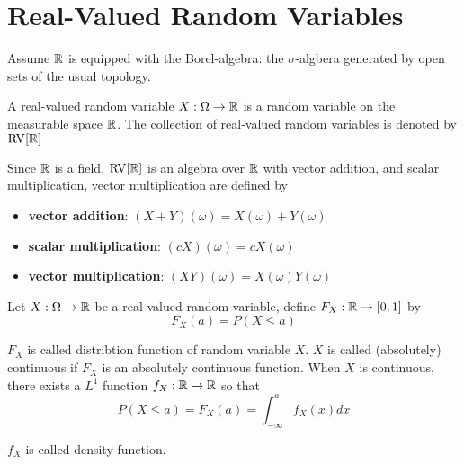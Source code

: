 \documentclass{report}
\begin{document}

\section{Real-Valued Random Variables}

Assume $\mathbb{R}$ is equipped with the Borel-algebra: the $\sigma$-algbera generated by open sets of the usual topology.

\begin{definition}
    A real-valued random variable $X: \Omega \to \mathbb{R}$ is a random variable on the measurable space $\mathbb{R}$. The collection of real-valued random variables is denoted by $\operatorname{RV}[\mathbb{R}]$
\end{definition}

\begin{proposition}
    Since $\mathbb{R}$ is a field, $\operatorname{RV}[\mathbb{R}]$ is an algebra over $\mathbb{R}$ with vector addition, and scalar multiplication, vector multiplication are defined by
    \begin{itemize}
        \item \textbf{vector addition}: $(X + Y)(\omega) = X(\omega) + Y(\omega)$
        \item \textbf{scalar multiplication}: $(cX)(\omega) = c X(\omega)$
        \item \textbf{vector multiplication}: $(XY)(\omega) = X(\omega) Y(\omega)$
    \end{itemize}
\end{proposition}

\begin{definition}
	Let $X: \Omega \to \mathbb{R}$ be a real-valued random variable, define $F_X: \mathbb{R} \to [0, 1]$ by
	$$
		F_X(a) = P(X \leq a)
	$$
	
	$F_X$ is called distribtion function of random variable $X$. $X$ is called (absolutely) continuous if $F_X$ is an absolutely continuous function. When $X$ is continuous, there exists a $L^1$ function $f_X: \mathbb{R} \to \mathbb{R}$ so that
	$$
		P(X \leq a) = F_X(a) = \int_{-\infty}^a f_X(x) dx
	$$
	
	$f_X$ is called density function.
\end{definition}
\end{document}

